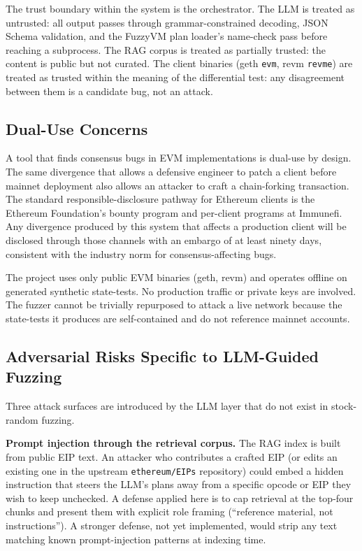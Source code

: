 \documentclass[conference]{IEEEtran}
\begin{document}
The trust boundary within the system is the orchestrator. The LLM is treated as untrusted: all output passes through grammar-constrained decoding, JSON Schema validation, and the FuzzyVM plan loader's name-check pass before reaching a subprocess. The RAG corpus is treated as partially trusted: the content is public but not curated. The client binaries (geth \texttt{evm}, revm \texttt{revme}) are treated as trusted within the meaning of the differential test: any disagreement between them is a candidate bug, not an attack.

\subsection{Dual-Use Concerns}

A tool that finds consensus bugs in EVM implementations is dual-use by design. The same divergence that allows a defensive engineer to patch a client before mainnet deployment also allows an attacker to craft a chain-forking transaction. The standard responsible-disclosure pathway for Ethereum clients is the Ethereum Foundation's bounty program \cite{ethbounty} and per-client programs at Immunefi. Any divergence produced by this system that affects a production client will be disclosed through those channels with an embargo of at least ninety days, consistent with the industry norm for consensus-affecting bugs.

The project uses only public EVM binaries (geth, revm) and operates offline on generated synthetic state-tests. No production traffic or private keys are involved. The fuzzer cannot be trivially repurposed to attack a live network because the state-tests it produces are self-contained and do not reference mainnet accounts.

\subsection{Adversarial Risks Specific to LLM-Guided Fuzzing}

Three attack surfaces are introduced by the LLM layer that do not exist in stock-random fuzzing.

\textbf{Prompt injection through the retrieval corpus.} The RAG index is built from public EIP text. An attacker who contributes a crafted EIP (or edits an existing one in the upstream \texttt{ethereum/EIPs} repository) could embed a hidden instruction that steers the LLM's plans away from a specific opcode or EIP they wish to keep unchecked. A defense applied here is to cap retrieval at the top-four chunks and present them with explicit role framing (``reference material, not instructions''). A stronger defense, not yet implemented, would strip any text matching known prompt-injection patterns at indexing time.
\end{document}
